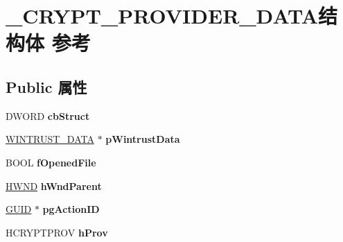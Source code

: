 \hypertarget{struct___c_r_y_p_t___p_r_o_v_i_d_e_r___d_a_t_a}{}\section{\+\_\+\+C\+R\+Y\+P\+T\+\_\+\+P\+R\+O\+V\+I\+D\+E\+R\+\_\+\+D\+A\+T\+A结构体 参考}
\label{struct___c_r_y_p_t___p_r_o_v_i_d_e_r___d_a_t_a}
\subsection*{Public 属性}
\begin{DoxyCompactItemize}
\item 
\mbox{\label{struct___c_r_y_p_t___p_r_o_v_i_d_e_r___d_a_t_a_a0f0fb8263232750a7ff233025e896f4a}} 
D\+W\+O\+RD {\bfseries cb\+Struct}
\item 
\mbox{\label{struct___c_r_y_p_t___p_r_o_v_i_d_e_r___d_a_t_a_a95bf4095533c4c06a4ebf95387183246}} 
\hyperlink{struct___w_i_n_t_r_u_s_t___d_a_t_a}{W\+I\+N\+T\+R\+U\+S\+T\+\_\+\+D\+A\+TA} $\ast$ {\bfseries p\+Wintrust\+Data}
\item 
\mbox{\label{struct___c_r_y_p_t___p_r_o_v_i_d_e_r___d_a_t_a_abe1e6713a340b911f40efeed1cd09432}} 
B\+O\+OL {\bfseries f\+Opened\+File}
\item 
\mbox{\label{struct___c_r_y_p_t___p_r_o_v_i_d_e_r___d_a_t_a_a75f9c230a153afd56995c1b5c8a6f257}} 
\hyperlink{interfacevoid}{H\+W\+ND} {\bfseries h\+Wnd\+Parent}
\item 
\mbox{\label{struct___c_r_y_p_t___p_r_o_v_i_d_e_r___d_a_t_a_a048cacdfd7c14e1956d05001f1c3e2f5}} 
\hyperlink{interface_g_u_i_d}{G\+U\+ID} $\ast$ {\bfseries pg\+Action\+ID}
\item 
\mbox{\label{struct___c_r_y_p_t___p_r_o_v_i_d_e_r___d_a_t_a_abf4957122a2e6ba209dc721486ea2186}} 
H\+C\+R\+Y\+P\+T\+P\+R\+OV {\bfseries h\+Prov}
\item 

\end{DoxyCompactItemize}
